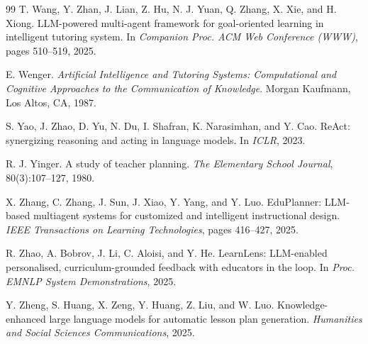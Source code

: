 \documentclass{article}
\begin{document}
\begin{thebibliography}{99}
 T. Wang, Y. Zhan, J. Lian, Z. Hu, N. J. Yuan, Q. Zhang,
X. Xie, and H. Xiong. LLM-powered multi-agent framework for goal-oriented learning in intelligent
tutoring system. In \emph{Companion Proc. ACM Web Conference (WWW)}, pages 510--519, 2025.

 E. Wenger. \emph{Artificial Intelligence and Tutoring
Systems: Computational and Cognitive Approaches to the Communication of Knowledge}. Morgan
Kaufmann, Los Altos, CA, 1987.

 S. Yao, J. Zhao, D. Yu, N. Du, I. Shafran, K. Narasimhan, and
Y. Cao. ReAct: synergizing reasoning and acting in language models. In \emph{ICLR}, 2023.

 R. J. Yinger. A study of teacher planning. \emph{The Elementary
School Journal}, 80(3):107--127, 1980.

 X. Zhang, C. Zhang, J. Sun, J. Xiao, Y. Yang, and Y. Luo.
EduPlanner: LLM-based multiagent systems for customized and intelligent instructional design.
\emph{IEEE Transactions on Learning Technologies}, pages 416--427, 2025.

 R. Zhao, A. Bobrov, J. Li, C. Aloisi, and Y. He. LearnLens:
LLM-enabled personalised, curriculum-grounded feedback with educators in the loop. In \emph{Proc.
EMNLP System Demonstrations}, 2025.

 Y. Zheng, S. Huang, X. Zeng, Y. Huang, Z. Liu, and W. Luo.
Knowledge-enhanced large language models for automatic lesson plan generation. \emph{Humanities
and Social Sciences Communications}, 2025.

\end{thebibliography}
\end{document}
